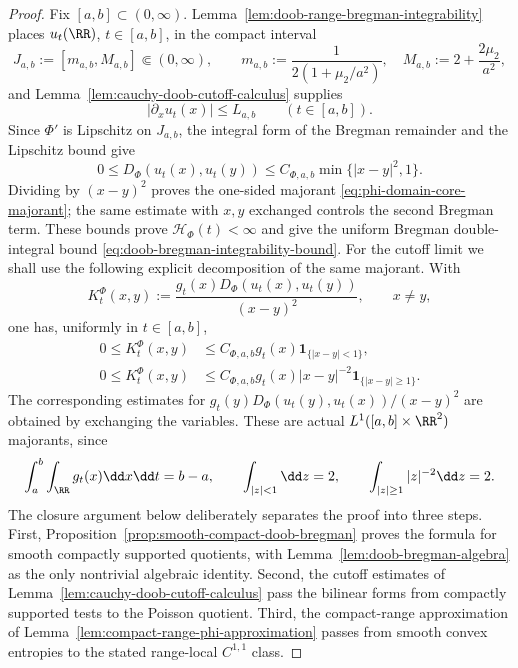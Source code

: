 \begin{proof}
Fix $[a,b]\subset(0,\infty)$.  Lemma~\ref{lem:doob-range-bregman-integrability}
places $u_t(\RR)$, $t\in[a,b]$, in the compact interval
\[
J_{a,b}:=[m_{a,b},M_{a,b}]
\Subset(0,\infty),
\qquad
m_{a,b}:=\frac{1}{2(1+\mu_2/a^2)},\quad
M_{a,b}:=2+\frac{2\mu_2}{a^2},
\]
and Lemma~\ref{lem:cauchy-doob-cutoff-calculus} supplies
\[
|\partial_xu_t(x)|\le L_{a,b}\qquad(t\in[a,b]).
\]
Since \(\Phi'\) is Lipschitz on \(J_{a,b}\), the integral form of the
Bregman remainder and the Lipschitz bound give
\[
0\le D_\Phi(u_t(x),u_t(y))
\le C_{\Phi,a,b}\min\{|x-y|^2,1\}.
\]
Dividing by \((x-y)^2\) proves the one-sided majorant
\eqref{eq:phi-domain-core-majorant}; the same estimate with \(x,y\)
exchanged controls the second Bregman term.  These bounds prove
\(\mathcal H_\Phi(t)<\infty\) and give the uniform Bregman double-integral
bound \eqref{eq:doob-bregman-integrability-bound}.
For the cutoff limit we shall use the following explicit decomposition of the
same majorant.  With
\[
K_t^\Phi(x,y):=
\frac{g_t(x)D_\Phi(u_t(x),u_t(y))}{(x-y)^2},
\qquad x\ne y,
\]
one has, uniformly in \(t\in[a,b]\),
\begin{align}
0\le K_t^\Phi(x,y)
&\le C_{\Phi,a,b}g_t(x)\mathbf 1_{\{|x-y|<1\}},
\label{eq:phi-cutoff-near-majorant}\\
0\le K_t^\Phi(x,y)
&\le C_{\Phi,a,b}g_t(x)|x-y|^{-2}
\mathbf 1_{\{|x-y|\ge1\}} .
\label{eq:phi-cutoff-far-majorant}
\end{align}
The corresponding estimates for
\(g_t(y)D_\Phi(u_t(y),u_t(x))/(x-y)^2\) are obtained by exchanging the
variables.  These are actual \(L^1([a,b]\times\RR^2)\) majorants, since
\[
\int_a^b\int_{\RR}g_t(x)\dd x\dd t=b-a,\qquad
\int_{|z|<1}\dd z=2,\qquad
\int_{|z|\ge1}|z|^{-2}\dd z=2 .
\]
The closure argument below deliberately separates the proof into three
steps.  First,
Proposition~\ref{prop:smooth-compact-doob-bregman} proves the formula for
smooth compactly supported quotients, with
Lemma~\ref{lem:doob-bregman-algebra} as the only nontrivial algebraic
identity.  Second, the cutoff estimates of
Lemma~\ref{lem:cauchy-doob-cutoff-calculus} pass the bilinear forms from
compactly supported tests to the Poisson quotient.  Third, the compact-range
approximation of Lemma~\ref{lem:compact-range-phi-approximation} passes from
smooth convex entropies to the stated range-local $C^{1,1}$ class.


\end{proof}
